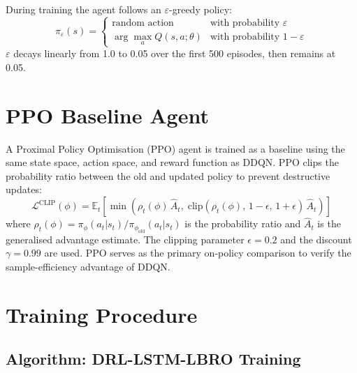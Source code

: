 During training the agent follows an $\varepsilon$-greedy policy:
\begin{equation}
  \pi_\varepsilon(s) =
  \begin{cases}
    \text{random action} & \text{with probability } \varepsilon \\
    \arg\max_a Q(s,a;\theta) & \text{with probability } 1-\varepsilon
  \end{cases}
  \label{eq:eps_greedy}
\end{equation}
$\varepsilon$ decays linearly from 1.0 to 0.05 over the first
500 episodes, then remains at 0.05.

\section{PPO Baseline Agent}
\label{sec:ppo}

A Proximal Policy Optimisation (PPO) agent is trained as a
baseline using the same state space, action space, and reward
function as DDQN. PPO clips the probability ratio between the old
and updated policy to prevent destructive updates:
\begin{equation}
  \mathcal{L}^{\text{CLIP}}(\phi) = \mathbb{E}_t \!\left[
    \min\!\left(
      \rho_t(\phi)\, \hat{A}_t,\;
      \text{clip}(\rho_t(\phi),\, 1{-}\epsilon,\, 1{+}\epsilon)\,
      \hat{A}_t
    \right)
  \right]
  \label{eq:ppo_clip}
\end{equation}
where $\rho_t(\phi) = \pi_\phi(a_t|s_t)/\pi_{\phi_{\text{old}}}
(a_t|s_t)$ is the probability ratio and $\hat{A}_t$ is the
generalised advantage estimate. The clipping parameter
$\epsilon = 0.2$ and the discount $\gamma = 0.99$ are used. PPO
serves as the primary on-policy comparison to verify the
sample-efficiency advantage of DDQN.

\section{Training Procedure}
\label{sec:training}

\subsection{Algorithm: DRL-LSTM-LBRO Training}

